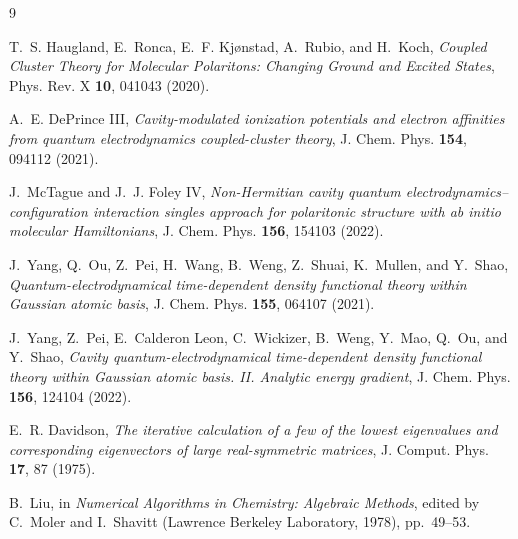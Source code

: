 \documentclass[11pt]{article}
\begin{document}
\begin{thebibliography}{9}

T.~S. Haugland, E.~Ronca, E.~F. Kj{\o}nstad, A.~Rubio, and H.~Koch,
\emph{Coupled Cluster Theory for Molecular Polaritons: Changing Ground and
Excited States}, Phys. Rev. X \textbf{10}, 041043 (2020).

A.~E. DePrince III,
\emph{Cavity-modulated ionization potentials and electron affinities from
quantum electrodynamics coupled-cluster theory},
J. Chem. Phys. \textbf{154}, 094112 (2021).

J.~McTague and J.~J. Foley IV,
\emph{Non-Hermitian cavity quantum electrodynamics--configuration interaction
singles approach for polaritonic structure with ab initio molecular
Hamiltonians}, J. Chem. Phys. \textbf{156}, 154103 (2022).

J.~Yang, Q.~Ou, Z.~Pei, H.~Wang, B.~Weng, Z.~Shuai, K.~Mullen, and Y.~Shao,
\emph{Quantum-electrodynamical time-dependent density functional theory within
Gaussian atomic basis}, J. Chem. Phys. \textbf{155}, 064107 (2021).

J.~Yang, Z.~Pei, E.~Calderon Leon, C.~Wickizer, B.~Weng, Y.~Mao, Q.~Ou, and
Y.~Shao,
\emph{Cavity quantum-electrodynamical time-dependent density functional theory
within Gaussian atomic basis. II. Analytic energy gradient},
J. Chem. Phys. \textbf{156}, 124104 (2022).

E.~R. Davidson,
\emph{The iterative calculation of a few of the lowest eigenvalues and
corresponding eigenvectors of large real-symmetric matrices},
J. Comput. Phys. \textbf{17}, 87 (1975).

B.~Liu, in \emph{Numerical Algorithms in Chemistry: Algebraic Methods}, edited by
C.~Moler and I.~Shavitt (Lawrence Berkeley Laboratory, 1978), pp.~49--53.

\end{thebibliography}
\end{document}
